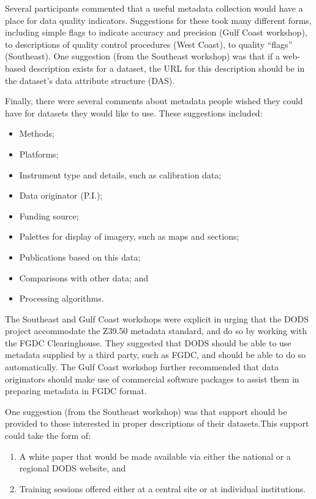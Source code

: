 \documentclass{report}
\begin{document}
Several participants commented that a useful metadata collection would
have a place for data quality indicators.  Suggestions for these took
many different forms, including simple flags to indicate accuracy and
precision (Gulf Coast workshop), to descriptions of quality control
procedures (West Coast), to quality ``flags'' (Southeast).  One
suggestion (from the Southeast workshop) was that if a web-based
description exists for a dataset, the URL for this description should
be in the dataset's data attribute structure (DAS).

Finally, there were several comments about metadata people wished they
could have for datasets they would like to use.  These suggestions
included:

\begin{itemize}
\item Methods;
\item Platforms;
\item Instrument type and details, such as calibration data;
\item Data originator (P.I.);
\item Funding source;
\item Palettes for display of imagery, such as maps and sections;
\item Publications based on this data; 
\item Comparisons with other data; and 
\item Processing algorithms.
\end{itemize}

The Southeast and Gulf Coast workshops were explicit in urging that
the DODS project accommodate the Z39.50 metadata standard, and do so
by working with the FGDC Clearinghouse.  They suggested that DODS
should be able to use metadata supplied by a third party, such as
FGDC, and should be able to do so automatically.  The Gulf Coast
workshop further recommended that data originators should make use of
commercial software packages to assist them in preparing metadata in
FGDC format.

One suggestion (from the Southeast workshop) was that support should
be provided to those interested in proper descriptions of their
datasets.This support could take the form of:

\begin{enumerate}
\item A white paper that would be made available via either the
national or a regional DODS website, and 
\item Training sessions offered either at a central site or at
individual institutions.
\end{enumerate}
\end{document}
